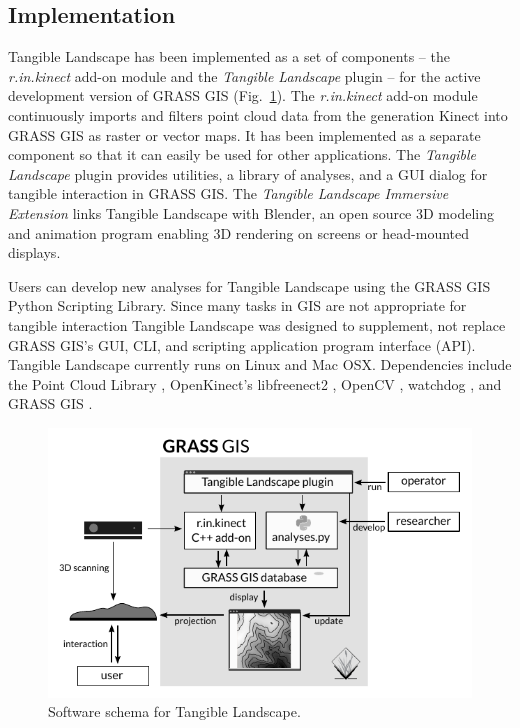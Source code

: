 \documentclass[prodmode,acmtochi]{acmsmall} %
\begin{document}
\subsection{Implementation}
Tangible Landscape has been implemented as a set of components 
-- the \emph{r.in.kinect} add-on module \cite{r.in.kinect}
and the \emph{Tangible Landscape} plugin \cite{grass-tangible-landscape}
--
for the active development version of GRASS GIS (Fig.~\ref{fig:software_schema}). 
The \emph{r.in.kinect} add-on module continuously imports and filters point cloud data from the  generation Kinect into GRASS GIS as raster or vector maps. 
It has been implemented as a separate component so that it can easily be used for other applications.
The \emph{Tangible Landscape} plugin provides 
utilities, a library of analyses, and a GUI dialog for tangible interaction in GRASS GIS.
The \emph{Tangible Landscape Immersive Extension} \cite{tangible-landscape-immersive-extension}
links Tangible Landscape with Blender, 
an open source 3D modeling and animation program \cite{Blender} 
enabling 3D rendering on screens or head-mounted displays.

Users can develop new analyses for Tangible Landscape 
using the GRASS GIS Python Scripting Library.  %
Since many tasks in GIS are not appropriate for tangible interaction
Tangible Landscape was designed to supplement, 
not replace GRASS GIS's GUI, CLI, and scripting application program interface (API). 
Tangible Landscape currently runs on Linux and Mac OSX.
Dependencies include the Point Cloud Library \cite{Rusu2011,PCL}, 
OpenKinect's libfreenect2 \cite{OpenKinect}, 
OpenCV \cite{OpenCV},  
watchdog \cite{watchdog}, 
and GRASS GIS \cite{GRASS_GIS_software}.

\begin{figure}
\begin{center}
		\includegraphics{images/software-schema.pdf}
	\caption{Software schema for Tangible Landscape.}
	\label{fig:software_schema}
\end{center}
\end{figure}
\end{document}
